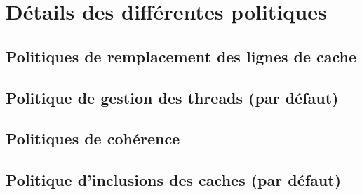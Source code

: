 \section{Détails des différentes politiques}
\label{politiques}

\subsection{Politiques de remplacement des lignes de cache}

\subsection{Politique de gestion des threads (par défaut)}

\subsection{Politiques de cohérence}

\subsection{Politique d'inclusions des caches (par défaut)}




